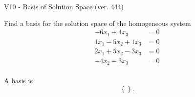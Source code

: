 \begin{exercise}
  \begin{exerciseTitle}V10 - Basis of Solution Space (ver. 444)\end{exerciseTitle}
  \begin{exerciseStatement}
    Find a basis for the solution space of the homogeneous system 
\begin{align*}
 -6 x_ 1 + 4 x_ 3 &= 0  \\ 
  1 x_ 1 -5 x_ 2 + 1 x_ 3 &= 0  \\ 
  2 x_ 1 + 5 x_ 2 -3 x_ 3 &= 0  \\ 
  -4 x_ 2 -3 x_ 3 &= 0  \\ 
 \end{align*}


 
  \end{exerciseStatement}

  \begin{exerciseAnswer}
   A basis is   
\[\left\{\right\}.\]

  


  \end{exerciseAnswer}
\end{exercise}
